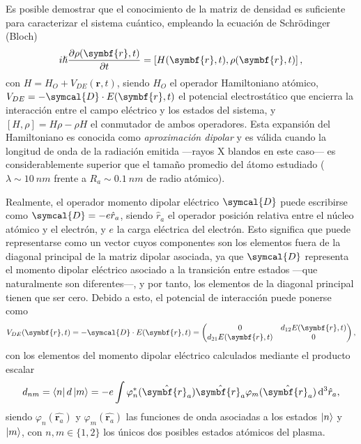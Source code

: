 Es posible demostrar \autocite{cohen-tannoudjiQuantumMechanicsVolume2019} que el conocimiento de la matriz de densidad es suficiente para caracterizar el sistema cuántico, empleando la ecuación de Schrödinger (Bloch)
\begin{equation}\label{eq:3.12}
  i \hslash \pdv{\rho(\symbf{r},t)}{t} = \left[H(\symbf{r},t),\rho(\symbf{r},t)\right],
\end{equation}
con $H = H_{O} + V_{DE}(\symbf{r},t)$, siendo $H_{O}$ el operador Hamiltoniano atómico, $V_{DE} = -\symcal{D} \cdot E(\symbf{r},t)$ el potencial electrostático que encierra la interacción entre el campo eléctrico y los estados del sistema, y $\left[H, \rho\right] = H \rho - \rho H$ el conmutador de ambos operadores. Esta expansión del Hamiltoniano es conocida como \emph{aproximación dipolar} \autocite{jackson1998classical} y es válida cuando la longitud de onda de la radiación emitida ---rayos X blandos en este caso--- es considerablemente superior que el tamaño promedio del átomo estudiado ($\lambda \sim \qty{10}{nm}$ frente a $R_{a} \sim \qty{0.1}{nm}$ de radio atómico). 

Realmente, el operador momento dipolar eléctrico $\symcal{D}$ puede escribirse como $\symcal{D} = -e \hat{r}_{a}$, siendo $\hat{r}_{a}$ el operador posición relativa entre el núcleo atómico y el electrón, y $e$ la carga eléctrica del electrón. Esto significa que puede representarse como un vector cuyos componentes son los elementos fuera de la diagonal principal de la matriz dipolar asociada, ya que $\symcal{D}$ representa el momento dipolar eléctrico asociado a la transición entre estados ---que naturalmente son diferentes---, y por tanto, los elementos de la diagonal principal tienen que ser cero. Debido a esto, el potencial de interacción puede ponerse como
\begin{equation}
  V_{DE}(\symbf{r},t) = -\symcal{D} \cdot E(\symbf{r},t) =  
  \begin{pmatrix}
    0 & d_{12}E(\symbf{r},t) \\
    d_{21}E(\symbf{r},t) & 0 \\
  \end{pmatrix},
\end{equation}
con los elementos del momento dipolar eléctrico calculados mediante el producto escalar 
\begin{equation}\label{eq:3.13}
  d_{nm} = \bra{n}d \ket{m} = -e \int \varphi^{*}_{n}(\hat{\symbf{r}_{a}}) \hat{\symbf{r}_{a}} \varphi_{m}(\hat{\symbf{r}_{a}}) \diff^{3}\hat{r}_{a},
\end{equation}
siendo $\varphi_{n}(\hat{\symbf{r}_{a}})$ y $\varphi_{m}(\hat{\symbf{r}_{a}})$ las funciones de onda asociadas a los estados $\left|n\right\rangle$ y $\left|m\right\rangle$, con $n, m \in \{1,2\}$ los únicos dos posibles estados atómicos del plasma.

